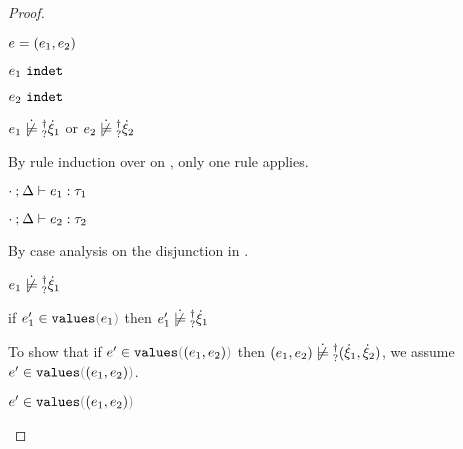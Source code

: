 \begin{proof}
\begin{byCases}
\begin{byCases}
\begin{byCases}
        \item[\text{(\ref{rule:IPair})}] 
        \begin{pfsteps*}
        \item $e=(e_1 , e_2)$ 
        \item $e_1 ~\mathtt{indet}$  
        \item $e_2 ~\mathtt{indet}$  
        \item $\cnotsatisfyormay{e_1}{\hxi_1}$ or $\cnotsatisfyormay{e_2}{\hxi_2}$  
        \end{pfsteps*}
        By rule induction over  on , only one rule applies.
        \begin{byCases}
          \item[\text{(\ref{rule:TPair})}]
          \begin{pfsteps*}
          \item $\cdot \mathbin{;} \Delta \vdash e_1 : \tau_1$  
          \item $\cdot \mathbin{;} \Delta \vdash e_2 : \tau_2$  
          \end{pfsteps*} 
          By case analysis on the disjunction in .
          \begin{byCases}
            \item[\cnotsatisfyormay{e_1}{\hxi_1}]
            \begin{pfsteps*}
            \item $\cnotsatisfyormay{e_1}{\hxi_1}$  
            \item if $\inValues{e_1'}{e_1}$ then $\cnotsatisfyormay{e_1'}{\hxi_1}$  
            \end{pfsteps*}
            To show that if $\inValues{e'}{\hpair{e_1}{e_2}}$ then $\cnotsatisfyormay{\hpair{e_1}{e_2}}{\cpair{\hxi_1}{\hxi_2}}$, we assume $\inValues{e'}{\hpair{e_1}{e_2}}$.
            \begin{pfsteps*}
            \item $\inValues{e'}{\hpair{e_1}{e_2}}$  
            \end{pfsteps*}

\end{byCases}
\end{byCases}
\end{byCases}
\end{byCases}
\end{byCases}
\end{proof}
